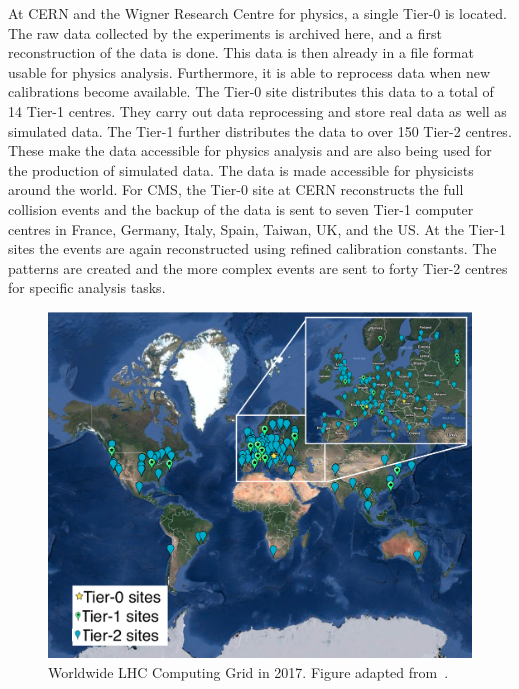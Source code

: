 At CERN and the Wigner Research Centre for physics, a single Tier-0 is located. The raw data collected by the experiments is archived here, and a first reconstruction of the data is done. This data is then already in a file format usable for physics analysis. Furthermore, it is able to reprocess data when new calibrations become available. The Tier-0 site distributes this data to a total of 14 Tier-1 centres. They carry out data reprocessing and store real data as well as simulated  data. The Tier-1 further distributes the data to over 150 Tier-2 centres. These make the data accessible for physics analysis and are also being used for the production of simulated data. The data is made accessible for  physicists around the world. For CMS, the Tier-0 site at CERN reconstructs the full collision events and the backup of the data is sent to seven Tier-1 computer centres in France, Germany, Italy, Spain, Taiwan, UK, and the US. At the Tier-1 sites the events are again reconstructed using refined calibration constants. The patterns are created and the more complex events are sent to forty Tier-2 centres for specific analysis tasks. 
\begin{figure}[htbp]
	\centering
	\includegraphics[width=1.\linewidth]{2_ExperimentalSetup/Figures/WLHCG}
	\caption{Worldwide LHC Computing Grid in 2017. Figure adapted from~\cite{WLCG}.}
	\label{fig:wlhcg}
\end{figure}
